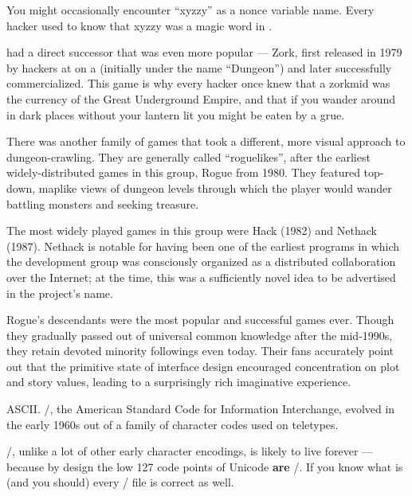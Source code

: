 You might occasionally encounter ``xyzzy'' as a nonce variable name. Every hacker
used to know that xyzzy was a magic word in .

 had a direct successor that was even more popular --- Zork, first released
in 1979 by hackers at  on a  (initially under the name ``Dungeon'') and
later successfully commercialized. This game is why every hacker once knew that
a zorkmid was the currency of the Great Underground Empire, and that if you
wander around in dark places without your lantern lit you might be eaten by a
grue.

There was another family of games that took a different, more visual approach
to dungeon-crawling. They are generally called ``roguelikes'', after the earliest
widely-distributed games in this group, Rogue from 1980. They featured
top-down, maplike views of dungeon levels through which the player would wander
battling monsters and seeking treasure.

The most widely played games in this group were Hack (1982) and Nethack (1987).
Nethack is notable for having been one of the earliest programs in which the
development group was consciously organized as a distributed collaboration over
the Internet; at the time, this was a sufficiently novel idea to be advertised
in the project's name.

Rogue's descendants were the most popular and successful  games ever. Though
they gradually passed out of universal common knowledge after the mid-1990s,
they retain devoted minority followings even today. Their fans accurately point
out that the primitive state of interface design encouraged concentration on
plot and story values, leading to a surprisingly rich imaginative experience.

\sect ASCII.
\ASCII/, the American Standard Code for Information Interchange, evolved in the
early 1960s out of a family of character codes used on teletypes.

\ASCII/, unlike a lot of other early character encodings, is likely to live
forever --- because by design the low 127 code points of Unicode {\bf are} \ASCII/. If
you know what  is (and you should) every \ASCII/ file is correct  as
well.

